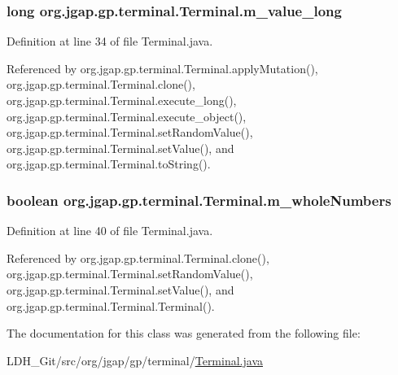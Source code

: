 \hypertarget{classorg_1_1jgap_1_1gp_1_1terminal_1_1_terminal_a334d28b40cf6496f5669690e219cdb70}{
\subsubsection[{m\-\_\-value\-\_\-long}]{\setlength{\rightskip}{0pt plus 5cm}long org.\-jgap.\-gp.\-terminal.\-Terminal.\-m\-\_\-value\-\_\-long\hspace{0.3cm}{\ttfamily [private]}}}\label{classorg_1_1jgap_1_1gp_1_1terminal_1_1_terminal_a334d28b40cf6496f5669690e219cdb70}


Definition at line 34 of file Terminal.\-java.



Referenced by org.\-jgap.\-gp.\-terminal.\-Terminal.\-apply\-Mutation(), org.\-jgap.\-gp.\-terminal.\-Terminal.\-clone(), org.\-jgap.\-gp.\-terminal.\-Terminal.\-execute\-\_\-long(), org.\-jgap.\-gp.\-terminal.\-Terminal.\-execute\-\_\-object(), org.\-jgap.\-gp.\-terminal.\-Terminal.\-set\-Random\-Value(), org.\-jgap.\-gp.\-terminal.\-Terminal.\-set\-Value(), and org.\-jgap.\-gp.\-terminal.\-Terminal.\-to\-String().

\hypertarget{classorg_1_1jgap_1_1gp_1_1terminal_1_1_terminal_ae820d0c745ec6234ecd0800fe39b66d4}{
\subsubsection[{m\-\_\-whole\-Numbers}]{\setlength{\rightskip}{0pt plus 5cm}boolean org.\-jgap.\-gp.\-terminal.\-Terminal.\-m\-\_\-whole\-Numbers\hspace{0.3cm}{\ttfamily [private]}}}\label{classorg_1_1jgap_1_1gp_1_1terminal_1_1_terminal_ae820d0c745ec6234ecd0800fe39b66d4}


Definition at line 40 of file Terminal.\-java.



Referenced by org.\-jgap.\-gp.\-terminal.\-Terminal.\-clone(), org.\-jgap.\-gp.\-terminal.\-Terminal.\-set\-Random\-Value(), org.\-jgap.\-gp.\-terminal.\-Terminal.\-set\-Value(), and org.\-jgap.\-gp.\-terminal.\-Terminal.\-Terminal().



The documentation for this class was generated from the following file\-:\begin{DoxyCompactItemize}
\item 
L\-D\-H\-\_\-\-Git/src/org/jgap/gp/terminal/\hyperlink{_terminal_8java}{Terminal.\-java}\end{DoxyCompactItemize}
